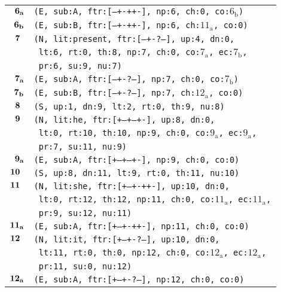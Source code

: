 \documentclass{article}
\begin{document}
\begin{minipage}{\textwidth}
{\begin{tabular}{|r|l|}
    ${\textbf{\textrm{6}}_{\textbf{\textrm{a}}}}$ & \texttt{\texttt{(E,~sub:A,~ftr:[---+-++-],~np:6,~ch:0,~co:${\textrm{6}_{\textrm{b}}}$)}} \\
    ${\textbf{\textrm{6}}_{\textbf{\textrm{b}}}}$ & \texttt{\texttt{(E,~sub:B,~ftr:[---+-++-],~np:6,~ch:${\textrm{11}_{\textrm{a}}}$,~co:0)}} \\
    ${\textbf{\textrm{7}}_{\phantom{z}}}$ & \texttt{\texttt{(N,~lit:present,~ftr:[---+-?--],~up:4,~dn:0,}} \\
    & \texttt{\texttt{~lt:6,~rt:0,~th:8,~np:7,~ch:0,~co:${\textrm{7}_{\textrm{a}}}$,~ec:${\textrm{7}_{\textrm{b}}}$,}} \\
    & \texttt{\texttt{~pr:6,~su:9,~nu:7)}} \\
    ${\textbf{\textrm{7}}_{\textbf{\textrm{a}}}}$ & \texttt{\texttt{(E,~sub:A,~ftr:[---+-?--],~np:7,~ch:0,~co:${\textrm{7}_{\textrm{b}}}$)}} \\
    ${\textbf{\textrm{7}}_{\textbf{\textrm{b}}}}$ & \texttt{\texttt{(E,~sub:B,~ftr:[---+-?--],~np:7,~ch:${\textrm{12}_{\textrm{a}}}$,~co:0)}} \\
    ${\textbf{\textrm{8}}_{\phantom{z}}}$ & \texttt{\texttt{(S,~up:1,~dn:9,~lt:2,~rt:0,~th:9,~nu:8)}} \\
    ${\textbf{\textrm{9}}_{\phantom{z}}}$ & \texttt{\texttt{(N,~lit:he,~ftr:[+--+--+-],~up:8,~dn:0,}} \\
    & \texttt{\texttt{~lt:0,~rt:10,~th:10,~np:9,~ch:0,~co:${\textrm{9}_{\textrm{a}}}$,~ec:${\textrm{9}_{\textrm{a}}}$,}} \\
    & \texttt{\texttt{~pr:7,~su:11,~nu:9)}} \\
    ${\textbf{\textrm{9}}_{\textbf{\textrm{a}}}}$ & \texttt{\texttt{(E,~sub:A,~ftr:[+--+--+-],~np:9,~ch:0,~co:0)}} \\
    ${\textbf{\textrm{10}}_{\phantom{z}}}$ & \texttt{\texttt{(S,~up:8,~dn:11,~lt:9,~rt:0,~th:11,~nu:10)}} \\
    ${\textbf{\textrm{11}}_{\phantom{z}}}$ & \texttt{\texttt{(N,~lit:she,~ftr:[+--+-++-],~up:10,~dn:0,}} \\
    & \texttt{\texttt{~lt:0,~rt:12,~th:12,~np:11,~ch:0,~co:${\textrm{11}_{\textrm{a}}}$,~ec:${\textrm{11}_{\textrm{a}}}$,}} \\
    & \texttt{\texttt{~pr:9,~su:12,~nu:11)}} \\
    ${\textbf{\textrm{11}}_{\textbf{\textrm{a}}}}$ & \texttt{\texttt{(E,~sub:A,~ftr:[+--+-++-],~np:11,~ch:0,~co:0)}} \\
    ${\textbf{\textrm{12}}_{\phantom{z}}}$ & \texttt{\texttt{(N,~lit:it,~ftr:[+--+-?--],~up:10,~dn:0,}} \\
    & \texttt{\texttt{~lt:11,~rt:0,~th:0,~np:12,~ch:0,~co:${\textrm{12}_{\textrm{a}}}$,~ec:${\textrm{12}_{\textrm{a}}}$,}} \\
    & \texttt{\texttt{~pr:11,~su:0,~nu:12)}} \\
    ${\textbf{\textrm{12}}_{\textbf{\textrm{a}}}}$ & \texttt{\texttt{(E,~sub:A,~ftr:[+--+-?--],~np:12,~ch:0,~co:0)}} \\
    \hline
  \end{tabular}
  }
\end{minipage}
\bigbreak
\end{document}
